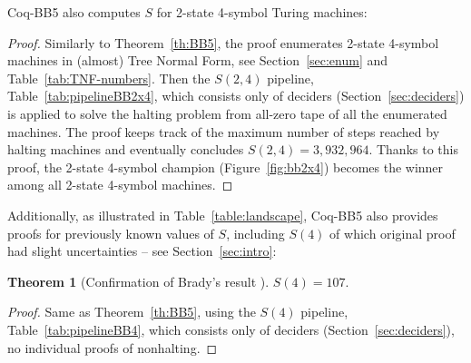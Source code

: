 \documentclass[a4paper,british]{article}
\theoremstyle{definition} %
\newtheorem{theorem}{Theorem}[section]
\numberwithin{equation}{section}
\theoremstyle{definition} %
\newcommand{\BBtheFourth}{107}
\newcommand{\BBTxF}{3{,}932{,}964}
\newcommand{\CoqBB}{Coq-BB5\xspace}
\begin{document}
\CoqBB also computes $S$ for 2-state 4-symbol Turing machines:

\thBBTxF*

\begin{proof}
    Similarly to Theorem~\ref{th:BB5}, the \Coq proof enumerates 2-state 4-symbol machines in (almost) Tree Normal Form, see Section~\ref{sec:enum} and Table~\ref{tab:TNF-numbers}. Then the $S(2,4)$ pipeline, Table~\ref{tab:pipelineBB2x4}, which consists only of deciders (Section~\ref{sec:deciders}) is applied to solve the halting problem from all-zero tape of all the enumerated machines. The proof keeps track of the maximum number of steps reached by halting machines and eventually concludes $S(2,4) = \BBTxF$. Thanks to this proof, the 2-state 4-symbol champion (Figure~\ref{fig:bb2x4}) becomes the winner among all 2-state 4-symbol machines.
\end{proof}

Additionally, as illustrated in Table~\ref{table:landscape}, \CoqBB also provides \Coq proofs for previously known values of $S$, including $S(4)$ of which original proof \cite{Brady83} had slight uncertainties -- see Section~\ref{sec:intro}:

\begin{theorem}[Confirmation of Brady's result \cite{Brady83}]\label{th:BB4}
    $S(4) = \BBtheFourth$.
\end{theorem}
\begin{proof}
    Same as Theorem~\ref{th:BB5}, using the $S(4)$ pipeline, Table~\ref{tab:pipelineBB4}, which consists only of deciders (Section~\ref{sec:deciders}), \ie no individual proofs of nonhalting.
\end{proof}

\newpage
\end{document}
